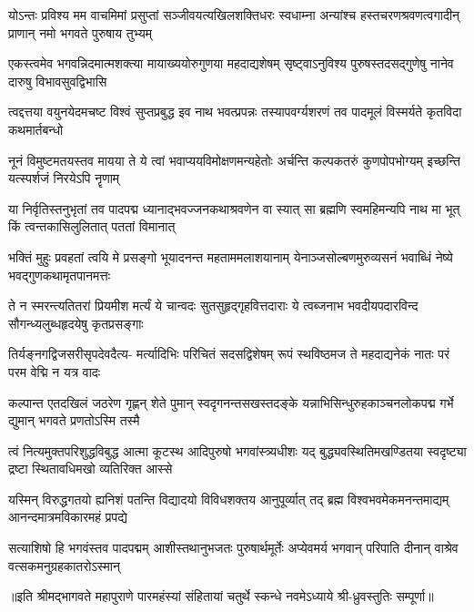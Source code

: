 
\fourlineindentedshloka
{योऽन्तः प्रविश्य मम वाचमिमां प्रसुप्तां}
{सञ्जीवयत्यखिलशक्तिधरः स्वधाम्ना}
{अन्यांश्च हस्तचरणश्रवणत्वगादीन्}
{प्राणान् नमो भगवते पुरुषाय तुभ्यम्}

\fourlineindentedshloka
{एकस्त्वमेव भगवन्निदमात्मशक्त्या}
{मायाख्ययोरुगुणया महदाद्यशेषम्}
{सृष्ट्वाऽनुविश्य पुरुषस्तदसद्गुणेषु}
{नानेव दारुषु विभावसुवद्विभासि}

\fourlineindentedshloka
{त्वद्दत्तया वयुनयेदमचष्ट विश्वं}
{सुप्तप्रबुद्ध इव नाथ भवत्प्रपन्नः}
{तस्यापवर्ग्यशरणं तव पादमूलं}
{विस्मर्यते कृतविदा कथमार्तबन्धो}

\fourlineindentedshloka
{नूनं विमुष्टमतयस्तव मायया ते}
{ये त्वां भवाप्ययविमोक्षणमन्यहेतोः}
{अर्चन्ति कल्पकतरुं कुणपोपभोग्यम्}
{इच्छन्ति यत्स्पर्शजं निरयेऽपि नॄणाम्}

\fourlineindentedshloka
{या निर्वृतिस्तनुभृतां तव पादपद्म}
{ध्यानाद्भवज्जनकथाश्रवणेन वा स्यात्}
{सा ब्रह्मणि स्वमहिमन्यपि नाथ मा भूत्}
{किं त्वन्तकासिलुलितात् पततां विमानात्}

\fourlineindentedshloka
{भक्तिं मुहुः प्रवहतां त्वयि मे प्रसङ्गो}
{भूयादनन्त महताममलाशयानाम्}
{येनाञ्जसोल्बणमुरुव्यसनं भवाब्धिं}
{नेष्ये भवद्गुणकथामृतपानमत्तः}

\fourlineindentedshloka
{ते न स्मरन्त्यतितरां प्रियमीश मर्त्यं}
{ये चान्वदः सुतसुहृद्गृहवित्तदाराः}
{ये त्वब्जनाभ भवदीयपदारविन्द}
{सौगन्ध्यलुब्धहृदयेषु कृतप्रसङ्गाः}

\fourlineindentedshloka
{तिर्यङ्नगद्विजसरीसृपदेवदैत्य-}
{मर्त्यादिभिः परिचितं सदसद्विशेषम्}
{रूपं स्थविष्ठमज ते महदाद्यनेकं}
{नातः परं परम वेद्मि न यत्र वादः}

\fourlineindentedshloka
{कल्पान्त एतदखिलं जठरेण गृह्णन्}
{शेते पुमान् स्वदृगनन्तसखस्तदङ्के}
{यन्नाभिसिन्धुरुहकाञ्चनलोकपद्म}
{गर्भे द्युमान् भगवते प्रणतोऽस्मि तस्मै}

\fourlineindentedshloka
{त्वं नित्यमुक्तपरिशुद्धविबुद्ध आत्मा}
{कूटस्थ आदिपुरुषो भगवांस्त्र्यधीशः}
{यद् बुद्ध्यवस्थितिमखण्डितया स्वदृष्ट्या}
{द्रष्टा स्थितावधिमखो व्यतिरिक्त आस्से}

\fourlineindentedshloka
{यस्मिन् विरुद्धगतयो ह्यनिशं पतन्ति}
{विद्यादयो विविधशक्तय आनुपूर्व्यात्}
{तद् ब्रह्म विश्वभवमेकमनन्तमाद्यम्}
{आनन्दमात्रमविकारमहं प्रपद्ये}

\fourlineindentedshloka
{सत्याशिषो हि भगवंस्तव पादपद्मम्}
{आशीस्तथानुभजतः पुरुषार्थमूर्तेः}
{अप्येवमर्य भगवान् परिपाति दीनान्}
{वाश्रेव वत्सकमनुग्रहकातरोऽस्मान्}

{॥इति श्रीमद्भागवते महापुराणे पारमहंस्यां संहितायां चतुर्थे स्कन्धे नवमेऽध्याये श्री-ध्रुवस्तुतिः सम्पूर्णा॥}
